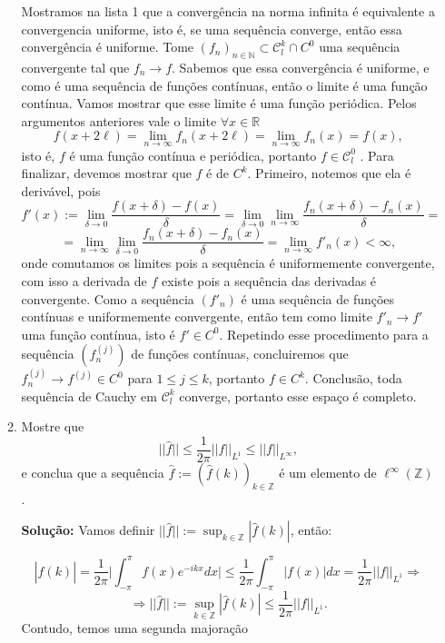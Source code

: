 \documentclass{article}
\begin{document}
\begin{enumerate}
\begin{enumerate}
			Mostramos na lista 1 que a convergência na norma infinita é equivalente a convergencia uniforme, isto é, se uma sequência converge, então essa convergência é uniforme. Tome $(f_{n})_{n \in \mathbb{N}} \subset \mathcal{C}^{k}_{l} \cap C^{0}$ uma sequência convergente tal que $f_{n} \to f$. Sabemos que essa convergência é uniforme, e como é uma sequência de funções contínuas, então o limite é uma função contínua. Vamos mostrar que esse limite é uma função periódica. Pelos argumentos anteriores vale o limite $\forall x \in \mathbb{R}$ 
			$$
			f(x + 2\ell) = \lim\limits_{n\to \infty} f_{n}(x + 2\ell) = \lim\limits_{n\to \infty} f_{n}(x ) = f(x),
			$$
			isto é, $f$ é uma função contínua e periódica, portanto $f \in \mathcal{C}^{0}_{l}$ . Para finalizar, devemos mostrar que $f$ é de $C^{k}$. Primeiro, notemos que ela é derivável, pois
			$$
			f'(x) := \lim_{\delta \to 0}\frac{f(x+\delta)- f(x)}{\delta} = \lim_{\delta \to 0}\lim_{n \to \infty} \frac{f_{n}(x+\delta)- f_{n}(x)}{\delta} =
			$$
			$$
			= \lim_{n \to \infty} \lim_{\delta \to 0}\frac{f_{n}(x+\delta)- f_{n}(x)}{\delta} = \lim_{n \to \infty}f'_{n}(x) < \infty,
			$$
			onde comutamos os limites pois a sequência é uniformemente convergente, com isso a derivada de $f$ existe pois a sequência das derivadas é convergente. Como a sequência $(f'_{n})$ é uma sequência de funções contínuas e uniformemente convergente, então tem como limite $f'_{n} \to f'$ uma função contínua, isto é $f' \in C^{0}$. Repetindo esse procedimento para a sequência $(f^{(j)}_{n})$ de funções contínuas, concluiremos que $f^{(j)}_{n} \to f^{(j)} \in C^{0}$ para $1 \leq j \leq k$, portanto $f \in C^{k}$. Conclusão, toda sequência de Cauchy em $\mathcal{C}^{k}_{l}$ converge, portanto esse espaço é completo.
			
			\item Mostre que
			$$
			||\hat{f}|| \leq \frac{1}{2\pi}||f||_{L^{1}}\leq ||f||_{L^{\infty}},
			$$
			e conclua que a sequência $\hat{f} := (\hat{f}(k))_{k \in \mathbb{Z}}$ é um elemento de $\ell^{\infty}(\mathbb{Z})$.
			
			\textbf{Solução:} Vamos definir $||\hat{f}||:= \sup_{k \in \mathbb{Z}}|\hat{f}(k)|$, então:
			
			$$
			|\hat{f}(k)| = \frac{1}{2\pi} \Big |\int_{-\pi}^{\pi} f(x)e^{-ikx}dx \Big | \leq \frac{1}{2\pi} \int_{-\pi}^{\pi} |f(x)|dx = \frac{1}{2\pi}||f||_{L^{1}} \Rightarrow  
			$$
			$$
			\Rightarrow ||\hat{f}||:= \sup_{k \in \mathbb{Z}}|\hat{f}(k)| \leq \frac{1}{2\pi}||f||_{L^{1}}.
			$$
			Contudo, temos uma segunda majoração
			

\end{enumerate}
\end{enumerate}
\end{document}
